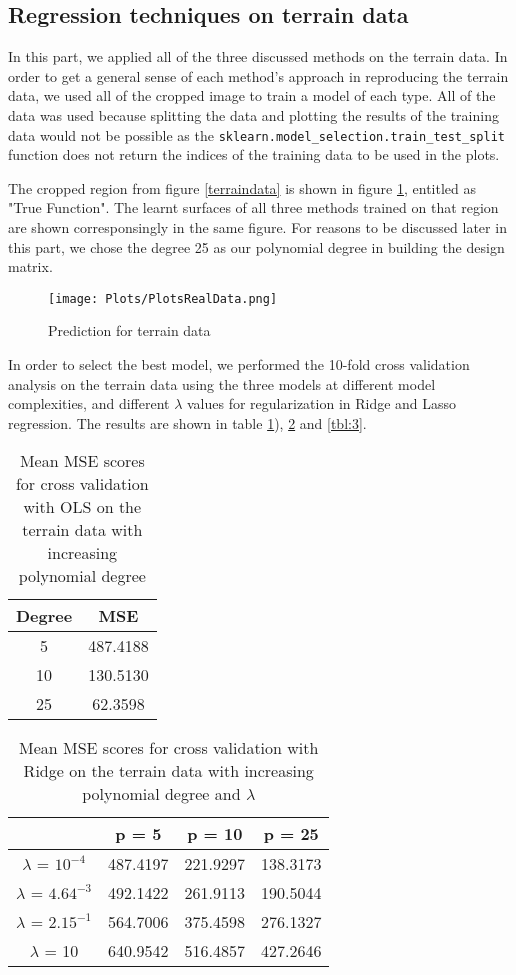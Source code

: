 \documentclass{article}
\begin{document}
\clearpage
\subsection{Regression techniques on terrain data}
In this part, we applied all of the three discussed methods on the terrain data. In order to get a general sense of each method's approach in reproducing the terrain data, we used all of the cropped image to train a model of each type. All of the data was used because splitting the data and plotting the results of the training data would not be possible as the \verb+sklearn.model_selection.train_test_split+ function does not return the indices of the training data to be used in the plots.

The cropped region from figure \ref{terraindata} is shown in figure \ref{fig:realDataPlot}, entitled as "True Function". The learnt surfaces of all three methods trained on that region are shown corresponsingly in the same figure. For reasons to be discussed later in this part, we chose the degree 25 as our polynomial degree in building the design matrix.
\begin{figure}[h!]\centering
\texttt{[image: Plots/PlotsRealData.png]}
\caption{Prediction for terrain data}
\label{fig:realDataPlot}
\end{figure}
In order to select the best model, we performed the 10-fold cross validation analysis on the terrain data using the three models at different model complexities, and different $\lambda$ values for regularization in Ridge and Lasso regression. The results are shown in table \ref{table:1}), \ref{tbl:2} and \ref{tbl:3}. 

\begin{table}[h!]
\centering
\begin{tabular}{||c c||} 
 \hline
 Degree & MSE \\ 
 \hline
 5 & 487.4188  \\ 
 10 & 130.5130  \\
 25 & 62.3598  \\  
 \hline
\end{tabular}
\caption{Mean MSE scores for cross validation with OLS on the terrain data with increasing polynomial degree}
\label{table:1}
\end{table}

\begin{table}[h!]
\centering
\begin{tabular}{||c c c c||}
\hline
& p = 5 & p = 10 & p = 25 \\
\hline
$\lambda$ = $10^{-4}$ & 487.4197 & 221.9297 & 138.3173 \\
\hline
$\lambda$ = $4.64^{-3}$ & 492.1422 & 261.9113 & 190.5044 \\ 
\hline
$\lambda$ = $2.15^{-1}$ & 564.7006 & 375.4598 & 276.1327 \\
\hline
$\lambda$ = 10 & 640.9542 & 516.4857 & 427.2646 \\
\hline
\end{tabular}
\caption{Mean MSE scores for cross validation with Ridge on the terrain data with increasing polynomial degree and $\lambda$}
\label{tbl:2}
\end{table}
\end{document}

